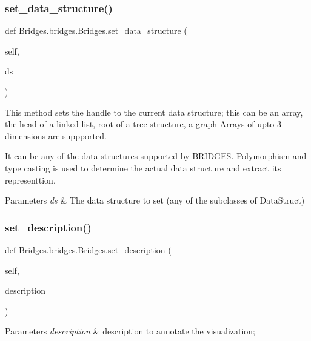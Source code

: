 \subsubsection{\texorpdfstring{set\+\_\+data\+\_\+structure()}{set\_data\_structure()}}
{\footnotesize\ttfamily def Bridges.\+bridges.\+Bridges.\+set\+\_\+data\+\_\+structure (\begin{DoxyParamCaption}\item[{}]{self,  }\item[{}]{ds }\end{DoxyParamCaption})}



This method sets the handle to the current data structure; this can be an array, the head of a linked list, root of a tree structure, a graph Arrays of upto 3 dimensions are suppported. 

It can be any of the data structures supported by B\+R\+I\+D\+G\+ES. Polymorphism and type casting is used to determine the actual data structure and extract its representtion.


\begin{DoxyParams}{Parameters}
{\em ds} & The data structure to set (any of the subclasses of Data\+Struct) \\
\hline
\end{DoxyParams}
\mbox{\label{class_bridges_1_1bridges_1_1_bridges_aa9af47e59998f5d9659c4d49295c6ece}} 
\subsubsection{\texorpdfstring{set\+\_\+description()}{set\_description()}}
{\footnotesize\ttfamily def Bridges.\+bridges.\+Bridges.\+set\+\_\+description (\begin{DoxyParamCaption}\item[{}]{self,  }\item[{}]{description }\end{DoxyParamCaption})}


\begin{DoxyParams}{Parameters}
{\em description} & description to annotate the visualization; \\
\hline
\end{DoxyParams}
\mbox{\label{class_bridges_1_1bridges_1_1_bridges_ae051d3b37125d0806f15a0990df5885c}} 
